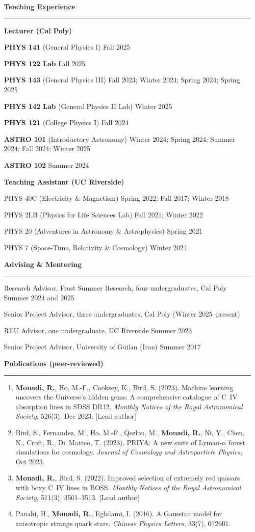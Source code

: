 \documentclass[11pt,letterpaper]{scrartcl}
\newcommand{\cvsection}[1]{%
  \vspace{4pt}%
  {\large\bfseries\textcolor{accent}{#1}}\par
  \vspace{2pt}\hrule\vspace{6pt}
}
\newcommand{\subentry}[2]{%
  \noindent #1 \hfill {\small #2}\par
}
\begin{document}
\cvsection{Teaching Experience }
\textbf{Lecturer (Cal Poly)}\par
\subentry{\textbf{PHYS 141} (General Physics I)}{Fall 2025}
\subentry{\textbf{PHYS 122 Lab}}{Fall 2025}
\subentry{\textbf{PHYS 143} (General Physics III)}{Fall 2023; Winter 2024; Spring 2024; Spring 2025}
\subentry{\textbf{PHYS 142 Lab} (General Physics II Lab)}{Winter 2025}
\subentry{\textbf{PHYS 121} (College Physics I)}{Fall 2024}
\subentry{\textbf{ASTRO 101} (Introductory Astronomy)}{Winter 2024; Spring 2024; Summer 2024; Fall 2024; Winter 2025}
\subentry{\textbf{ASTRO 102}}{Summer 2024}

\textbf{Teaching Assistant (UC Riverside)}\par
\subentry{PHYS 40C (Electricity \& Magnetism)}{Spring 2022; Fall 2017; Winter 2018}
\subentry{PHYS 2LB (Physics for Life Sciences Lab)}{Fall 2021; Winter 2022}
\subentry{PHYS 20 (Adventures in Astronomy \& Astrophysics)}{Spring 2021}
\subentry{PHYS 7 (Space-Time, Relativity \& Cosmology)}{Winter 2021}

\cvsection{Advising \& Mentoring}
\subentry{Research Advisor, Frost Summer Research, four undergraduates, Cal Poly}{Summer 2024 and 2025}
\subentry{Senior Project Advisor, three undergraduates, Cal Poly}{(Winter 2025--present) }
\subentry{REU Advisor, one undergraduate, UC Riverside }{Summer 2023 }
\subentry{Senior Project Advisor, University of Guilan (Iran)}{Summer 2017}

\cvsection{Publications (peer-reviewed)}
\begin{enumerate}[label=\arabic*.,leftmargin=1.6em]
  \item \textbf{Monadi, R.}, Ho, M.-F., Cooksey, K., Bird, S. (2023).
  Machine learning uncovers the Universe’s hidden gems: A comprehensive catalogue of C~IV absorption lines in SDSS DR12.
  \emph{Monthly Notices of the Royal Astronomical Society}, 526(3), Dec 2023. [Lead author]

  \item Bird, S., Fernandez, M., Ho, M.-F., Qezlou, M., \textbf{Monadi, R.}, Ni, Y., Chen, N., Croft, R., Di~Matteo, T. (2023).
  PRIYA: A new suite of Lyman-\texorpdfstring{$\alpha$}{alpha} forest simulations for cosmology.
  \emph{Journal of Cosmology and Astroparticle Physics}, Oct 2023.

  \item \textbf{Monadi, R.}, Bird, S. (2022).
  Improved selection of extremely red quasars with boxy C~IV lines in BOSS.
  \emph{Monthly Notices of the Royal Astronomical Society}, 511(3), 3501--3513. [Lead author]

  \item Panahi, H., \textbf{Monadi, R.}, Eghdami, I. (2016).
  A Gaussian model for anisotropic strange quark stars.
  \emph{Chinese Physics Letters}, 33(7), 072601.
\end{enumerate}
\end{document}
